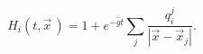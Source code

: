 \begin{equation}
H_i(t,\vec x\,) = 1 + e^{-\hat{g}t}\sum_j{\frac{q_i^j}{|\vec x-\vec x_j|}}.
\end{equation}

